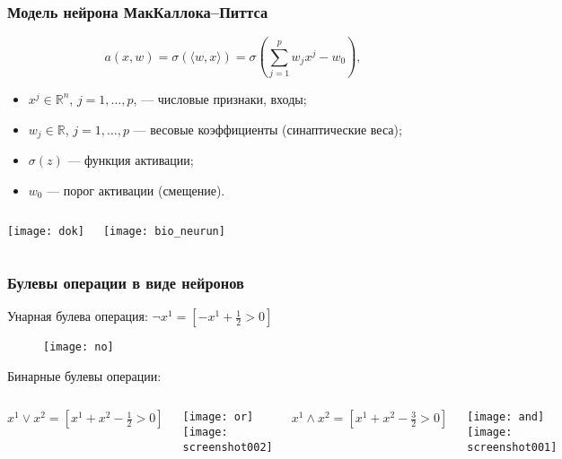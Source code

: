 \documentclass[unicode, notheorems]{beamer}
\begin{document}
\begin{frame}
	\frametitle{Модель нейрона МакКаллока–Питтса}
\begin{equation*}
a(x, w) = \sigma( \langle w,x \rangle ) = \sigma\left(\sum_{j=1}^{p} w_j x^j - w_0 \right),
\end{equation*}
\begin{itemize}
	\item $x^j \in \mathbb{R}^n$, $j=1,\ldots,p$, --- числовые признаки, входы;
	\item $w_j \in \mathbb{R}$, $j=1,\ldots,p$ --- весовые коэффициенты (синаптические веса); 
	\item $\sigma(z)$ --- функция активации;
	\item $w_0$ --- порог активации (смещение).
	
\end{itemize}

\begin{columns}
	\begin{center}
			\texttt{[image: dok]}
		
	\end{center}
	\begin{center}
		\texttt{[image: bio\_neurun]}
	\end{center}
\end{columns} 
\end{frame}


	




\begin{frame}
		\frametitle{Булевы операции в виде нейронов}
		Унарная булева операция:
			$\neg x^1 = \left[-x^1 + \frac{1}{2} > 0 \right]$\\			
\begin{figure}
	\centering
	\texttt{[image: no]}
\end{figure}
		Бинарные булевы операции:
			
\begin{columns}
	
	$x^1\vee x^2=\left[x^1 + x^2 - \frac{1}{2} > 0 \right]$
	\begin{center}
		\texttt{[image: or]}\\
		\texttt{[image: screenshot002]}
	
	\end{center}
	$x^1 \wedge x^2 = \left[x^1 + x^2 - \frac{3}{2} > 0\right] $\\
	\begin{center}
		\texttt{[image: and]}\\
		\texttt{[image: screenshot001]}
	\end{center}
\end{columns}

		
\end{frame}
\end{document}
